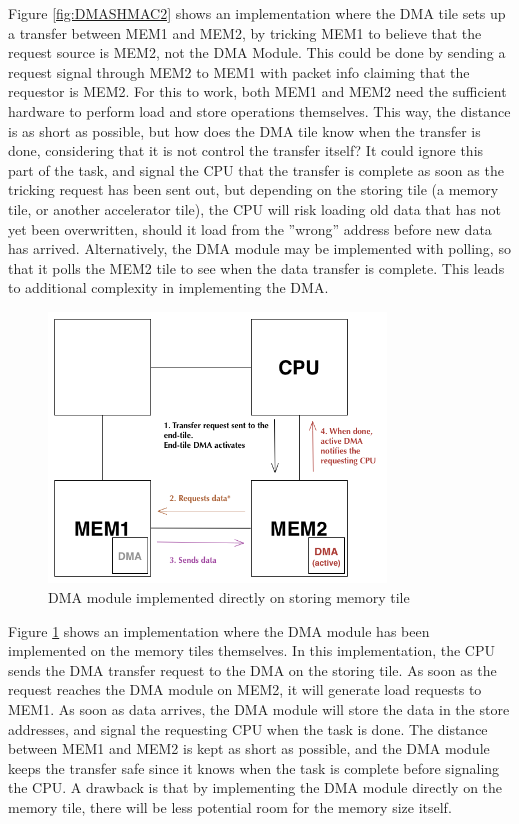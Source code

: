 Figure \ref{fig:DMASHMAC2} shows an implementation where the DMA tile sets up a transfer between MEM1 and MEM2, by tricking MEM1 to believe that the request source is MEM2, not the DMA Module.
This could be done by sending a request signal through MEM2 to MEM1 with packet info claiming that the requestor is MEM2.
For this to work, both MEM1 and MEM2 need the sufficient hardware to perform load and store operations themselves.
This way, the distance is as short as possible, but how does the DMA tile know when the transfer is done, considering that it is not control the transfer itself?
It could ignore this part of the task, and signal the CPU that the transfer is complete as soon as the tricking request has been sent out, but depending on the storing tile (a memory tile, or another accelerator tile), the CPU will risk loading old data that has not yet been overwritten, should it load from the ''wrong'' address before new data has arrived.
Alternatively, the DMA module may be implemented with polling, so that it polls the MEM2 tile to see when the data transfer is complete.
This leads to additional complexity in implementing the DMA.
 
\begin{figure}[h!]
    \centering
    \includegraphics[width=0.8\textwidth]{Figures/DMA/DMASHMAC3}
    \caption{DMA module implemented directly on storing memory tile}
    \label{fig:DMASHMAC3}
\end{figure}
 
Figure \ref{fig:DMASHMAC3} shows an implementation where the DMA module has been implemented on the memory tiles themselves.
In this implementation, the CPU sends the DMA transfer request to the DMA on the storing tile.
As soon as the request reaches the DMA module on MEM2, it will generate load requests to MEM1.
As soon as data arrives, the DMA module will store the data in the store addresses, and signal the requesting CPU when the task is done.
The distance between MEM1 and MEM2 is kept as short as possible, and the DMA module keeps the transfer safe since it knows when the task is complete before signaling the CPU.
A drawback is that by implementing the DMA module directly on the memory tile, there will be less potential room for the memory size itself.


